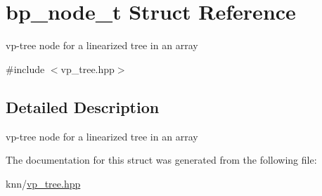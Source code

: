\hypertarget{structbp__node__t}{}\section{bp\+\_\+node\+\_\+t Struct Reference}
\label{structbp__node__t}


vp-\/tree node for a linearized tree in an array  




{\ttfamily \#include $<$vp\+\_\+tree.\+hpp$>$}



\subsection{Detailed Description}
vp-\/tree node for a linearized tree in an array 

The documentation for this struct was generated from the following file\+:\begin{DoxyCompactItemize}
\item 
knn/\hyperlink{vp__tree_8hpp}{vp\+\_\+tree.\+hpp}\end{DoxyCompactItemize}
